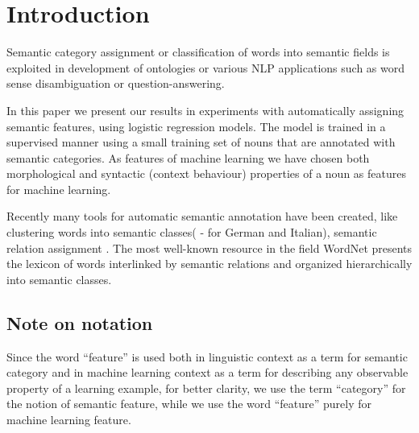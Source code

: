 \documentclass[letterpaper]{article}
\begin{document}
%

\title{}
\maketitle
\begin{abstract}
\begin{quote}
\end{quote}
\end{abstract}


\section{Introduction}

Semantic category assignment or classification of words into semantic fields
is exploited in development of ontologies or various NLP applications such as
word sense disambiguation or question-answering.

In this paper we present our results in experiments with automatically assigning semantic features,
using logistic regression models. The model is trained in a supervised manner
using a small training set of nouns that are annotated with semantic categories.
As features of machine learning 
we have chosen both morphological and syntactic (context behaviour) properties 
of a noun as features for machine learning.

Recently many tools for automatic semantic annotation have been created, like
clustering  words into semantic classes(\cite{baroni:2009} - for German and Italian), 
semantic relation assignment \cite{peirsman}. The most well-known resource
in the field WordNet \cite{wordnet} presents the lexicon of words
interlinked by semantic relations and organized hierarchically into 
semantic classes. 

\subsection{Note on notation}
Since the word ``feature'' is used both in linguistic context as a term for semantic category and in machine learning context as a term for describing any observable property of a learning example, for better clarity, we use the term ``category'' for the notion of semantic feature, while we use the word ``feature'' purely for machine learning feature.
\end{document}

